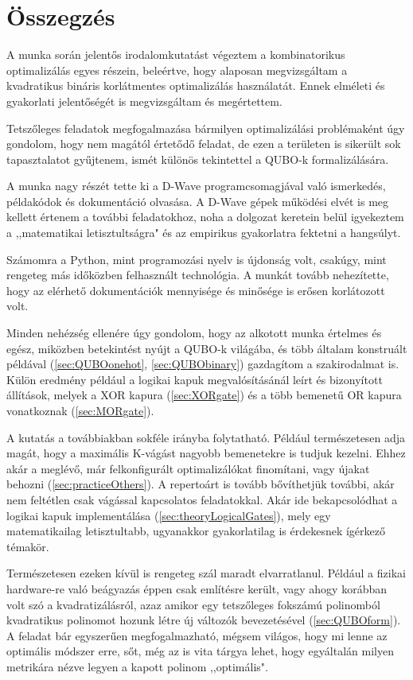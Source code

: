 
\chapter{Összegzés}

A munka során jelentős irodalomkutatást végeztem a kombinatorikus optimalizálás egyes részein, beleértve, hogy alaposan megvizsgáltam a kvadratikus bináris korlátmentes optimalizálás használatát. Ennek elméleti és gyakorlati jelentőségét is megvizsgáltam és megértettem.

Tetszőleges feladatok megfogalmazása bármilyen optimalizálási problémaként úgy gondolom, hogy nem magától értetődő feladat, de ezen a területen is sikerült sok tapasztalatot gyűjtenem, ismét különös tekintettel a QUBO-k formalizálására.

A munka nagy részét tette ki a D-Wave programcsomagjával való ismerkedés, példakódok és dokumentáció olvasása. A D-Wave gépek működési elvét is meg kellett értenem a további feladatokhoz, noha a dolgozat keretein belül igyekeztem a ,,matematikai letisztultságra" és az empirikus gyakorlatra fektetni a hangsúlyt.

Számomra a Python, mint programozási nyelv is újdonság volt, csakúgy, mint rengeteg más időközben felhasznált technológia. A munkát tovább nehezítette, hogy az elérhető dokumentációk mennyisége és minősége is erősen korlátozott volt.

Minden nehézség ellenére úgy gondolom, hogy az alkotott munka értelmes és egész, miközben betekintést nyújt a QUBO-k világába, és több általam konstruált példával (\ref{sec:QUBOonehot}, \ref{sec:QUBObinary}) gazdagítom a szakirodalmat is. Külön eredmény például a logikai kapuk megvalósításánál leírt és bizonyított állítások, melyek a XOR kapura (\ref{sec:XORgate}) és a több bemenetű OR kapura vonatkoznak (\ref{sec:MORgate}).

A kutatás a továbbiakban sokféle irányba folytatható. Például természetesen adja magát, hogy a maximális K-vágást nagyobb bemenetekre is tudjuk kezelni. Ehhez akár a meglévő, már felkonfigurált optimalizálókat finomítani, vagy újakat behozni (\ref{sec:practiceOthers}). A repertoárt is tovább bővíthetjük további, akár nem feltétlen csak vágással kapcsolatos feladatokkal. Akár ide bekapcsolódhat a logikai kapuk implementálása (\ref{sec:theoryLogicalGates}), mely egy matematikailag letisztultabb, ugyanakkor gyakorlatilag is érdekesnek ígérkező témakör.

Természetesen ezeken kívül is rengeteg szál maradt elvarratlanul. Például a fizikai hardware-re való beágyazás éppen csak említésre került, vagy ahogy korábban volt szó a kvadratizálásról, azaz amikor egy tetszőleges fokszámú polinomból kvadratikus polinomot hozunk létre új változók bevezetésével (\ref{sec:QUBOform}). A feladat bár egyszerűen megfogalmazható, mégsem világos, hogy mi lenne az optimális módszer erre, sőt, még az is vita tárgya lehet, hogy egyáltalán milyen metrikára nézve legyen a kapott polinom ,,optimális".